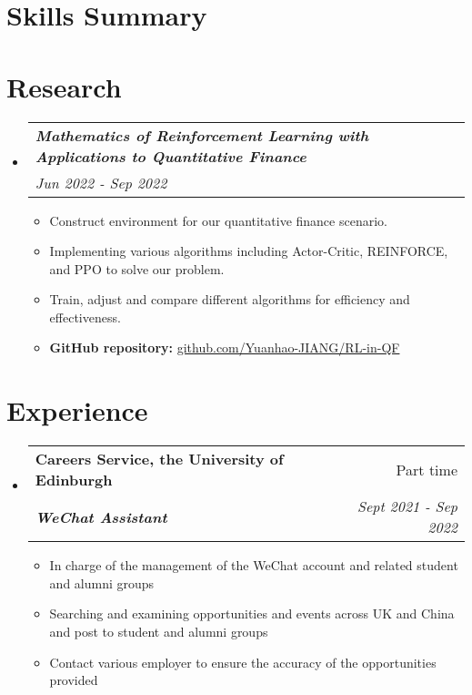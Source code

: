 \documentclass[12pt, a4paper]{article}
\makeatletter
\newcommand{\resumeSection}[1]{
    \section*{#1}
}
\newcommand{\resumeSectionItm}[4]{
\item
    \begin{tabular*}{0.96\textwidth}{@{}l@{\extracolsep{\fill}}r@{}}
        \textbf{#1} & #2 \\
        \textit{\textbf{#3}} & \textit{#4}
    \end{tabular*}
}
\newcommand{\resumeResearchItm}[2]{
\item
    \begin{tabular*}{0.96\textwidth}{@{}l@{\extracolsep{\fill}}r@{}}
        \hspace{-1.5mm}\textit{\textbf{#1}} & \\
        \hspace{0.5mm}\textit{#2} &
    \end{tabular*}
}
\newcommand{\resumeSectionSubItm}[2]{
\item
    \textbf{\parbox[t]{4.7cm}{#1\hfill}}\parbox[t]{12.5cm}{#2}\vspace{-2mm}
}
\newcommand{\resumeSectionSubItmI}[1]{
\item {#1}\vspace{-2mm}
}
\newcommand{\resumeSectionSubItmII}[2]{
\item \textbf{#1: }{#2}\vspace{-2mm}
}
\makeatother
\begin{document}
\resumeSection{Skills Summary}
\vspace{-2.5mm}

\resumeSection{Research}
\begin{itemize}[leftmargin=*]
    \resumeResearchItm{
        Mathematics of Reinforcement Learning with Applications to
        Quantitative Finance
    }{Jun 2022 - Sep 2022}
    \vspace{-2mm}
    \begin{itemize}[leftmargin=*]
        \resumeSectionSubItmI{
            Construct environment for our quantitative finance scenario.
        }
        \resumeSectionSubItmI{
            Implementing various algorithms including Actor-Critic, REINFORCE,
            and PPO to solve our problem.
        }
        \resumeSectionSubItmI{
            Train, adjust and compare different algorithms for efficiency and
            effectiveness.
        }
        \resumeSectionSubItmII{GitHub repository}{
        \href{https://github.com/Yuanhao-JIANG/RL-in-QF}
        {github.com/Yuanhao-JIANG/RL-in-QF}}
    \end{itemize}
\end{itemize}
\vspace{-3mm}

\resumeSection{Experience}
\begin{itemize}[leftmargin=*]
    \resumeSectionItm
    {Careers Service, the University of Edinburgh}{Part time}
    {WeChat Assistant}{Sept 2021 - Sep 2022}
    \vspace{-2mm}
    \begin{itemize}[leftmargin=*]
        \resumeSectionSubItmI{
            In charge of the management of the WeChat account and related
            student and alumni groups
        }
        \resumeSectionSubItmI{
            Searching and examining opportunities and events across UK and
            China and post to student and alumni groups
        }
        \resumeSectionSubItmI{
            Contact various employer to ensure the accuracy of the
            opportunities provided
        }
    \end{itemize}
\end{itemize}
\vspace{-3mm}
\end{document}
